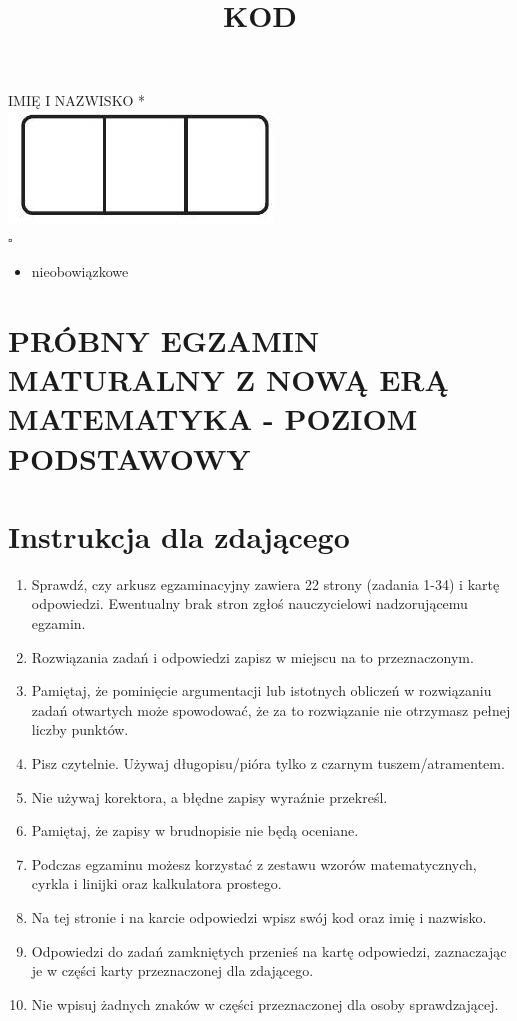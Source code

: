 \documentclass[10pt]{article}
\title{KOD }
\author{}
\date{}
\begin{document}
\maketitle
IMIĘ I NAZWISKO *\\
\includegraphics[max width=\textwidth, center]{2024_11_21_1e89351873aa60c4c1b9g-01}\\
\(\square\)

\begin{itemize}
  \item nieobowiązkowe
\end{itemize}

\section*{PRÓBNY EGZAMIN MATURALNY Z NOWĄ ERĄ MATEMATYKA - POZIOM PODSTAWOWY}
\section*{Instrukcja dla zdającego}
\begin{enumerate}
  \item Sprawdź, czy arkusz egzaminacyjny zawiera 22 strony (zadania 1-34) i kartę odpowiedzi. Ewentualny brak stron zgłoś nauczycielowi nadzorującemu egzamin.
  \item Rozwiązania zadań i odpowiedzi zapisz w miejscu na to przeznaczonym.
  \item Pamiętaj, że pominięcie argumentacji lub istotnych obliczeń w rozwiązaniu zadań otwartych może spowodować, że za to rozwiązanie nie otrzymasz pełnej liczby punktów.
  \item Pisz czytelnie. Używaj długopisu/pióra tylko z czarnym tuszem/atramentem.
  \item Nie używaj korektora, a błędne zapisy wyraźnie przekreśl.
  \item Pamiętaj, że zapisy w brudnopisie nie będą oceniane.
  \item Podczas egzaminu możesz korzystać z zestawu wzorów matematycznych, cyrkla i linijki oraz kalkulatora prostego.
  \item Na tej stronie i na karcie odpowiedzi wpisz swój kod oraz imię i nazwisko.
  \item Odpowiedzi do zadań zamkniętych przenieś na kartę odpowiedzi, zaznaczając je w części karty przeznaczonej dla zdającego.
  \item Nie wpisuj żadnych znaków w części przeznaczonej dla osoby sprawdzającej.
\end{enumerate}
\end{document}
